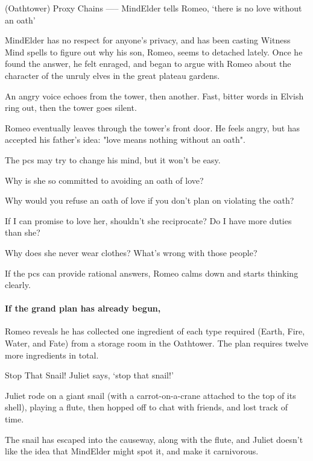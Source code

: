 (Oathtower) Proxy Chains
-----
{MindElder tells Romeo, `there is no love without an oath'}

\Gls{MindElder} has no respect for anyone's privacy, and has been casting Witness Mind spells to figure out why his son, Romeo, seems to detached lately.
Once he found the answer, he felt enraged, and began to argue with Romeo about the character of the unruly elves in the great plateau gardens.

\begin{boxtext}
  An angry voice echoes from the tower, then another.
  Fast, bitter words in Elvish ring out, then the tower goes silent.
\end{boxtext}

Romeo eventually leaves through the tower's front door.
He feels angry, but has accepted his father's idea: "love means nothing without an oath".

The \glspl{pc} may try to change his mind, but it won't be easy.

\begin{speechtext}
  Why is she so committed to avoiding an oath of love?

  Why would you refuse an oath of love if you don't plan on violating the oath?

  If I can promise to love her, shouldn't she reciprocate?
  Do I have more duties than she?

  Why does she never wear clothes?
  What's wrong with those people?
\end{speechtext}

If the \glspl{pc} can provide rational answers, Romeo calms down and starts thinking clearly.

\paragraph{If the grand plan has already begun,}
Romeo reveals he has collected one \gls{ingredient} of each type required (Earth, Fire, Water, and Fate) from a storage room in the Oathtower.
The plan requires twelve more \glspl{ingredient} in total.

{Stop That Snail!}%
{Juliet says, `stop that snail!'}%

Juliet rode on a giant snail (with a carrot-on-a-crane attached to the top of its shell), playing a flute, then hopped off to chat with friends, and lost track of time.

The snail has escaped into the causeway, along with the flute, and Juliet doesn't like the idea that \gls{MindElder} might spot it, and make it carnivorous.

